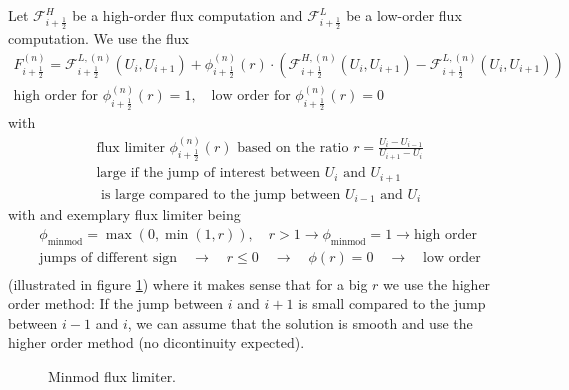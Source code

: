 Let $\mathcal{F}^H_{i+\frac{1}{2}}$ be a high-order flux computation and $\mathcal{F}^L_{i+\frac{1}{2}}$ be a low-order flux computation.
We use the flux
\begin{equation}
    \begin{gathered}
        F_{i+\frac{1}{2}}^{(n)}=\mathcal{F}_{i+\frac{1}{2}}^{L,(n)}\left(U_i, U_{i+1}\right)+\phi_{i+\frac{1}{2}}^{(n)}(r) \cdot\left(\mathcal{F}_{i+\frac{1}{2}}^{H,(n)}\left(U_i, U_{i+1}\right)-\mathcal{F}_{i+\frac{1}{2}}^{L,(n)}\left(U_i, U_{i+1}\right)\right) \\
        \text{high order for } \phi_{i+\frac{1}{2}}^{(n)}(r) = 1, \quad \text{low order for } \phi_{i+\frac{1}{2}}^{(n)}(r) = 0
    \end{gathered}
\end{equation}
with
\begin{equation}
    \begin{gathered}
        \text{flux limiter } \phi_{i+\frac{1}{2}}^{(n)}(r) \text{ based on the ratio } r = \frac{U_i - U_{i-1}}{U_{i+1} - U_{i}} \\
        \text{large if the jump of interest between } U_i \text{ and } U_{i+1} \\
        \text{ is large compared to the jump between } U_{i-1} \text{ and } U_{i}
    \end{gathered}
\end{equation}
with and exemplary flux limiter being
\begin{equation}
    \begin{gathered}
        \phi_{\text{minmod}} = \max(0, \min(1, r)), \quad r > 1 \rightarrow \phi_{\text{minmod}} = 1 \rightarrow \text{high order} \\
        \text{jumps of different sign} \quad \rightarrow \quad r \leq 0 \quad \rightarrow \quad \phi(r) = 0 \quad \rightarrow \quad \text{low order} \\
    \end{gathered}
\end{equation}
(illustrated in figure \ref{fig:minmod}) where it makes sense that for a big $r$ we use the higher order method: \textcolor{blue1}{If the jump between $i$ and $i+1$ is small compared to the jump between $i-1$ and $i$, we can assume that the solution is smooth and use the higher order method (no dicontinuity expected).}

\begin{figure}[htb!]
    \centering
    
    \caption{Minmod flux limiter.}
    \label{fig:minmod}
\end{figure}

